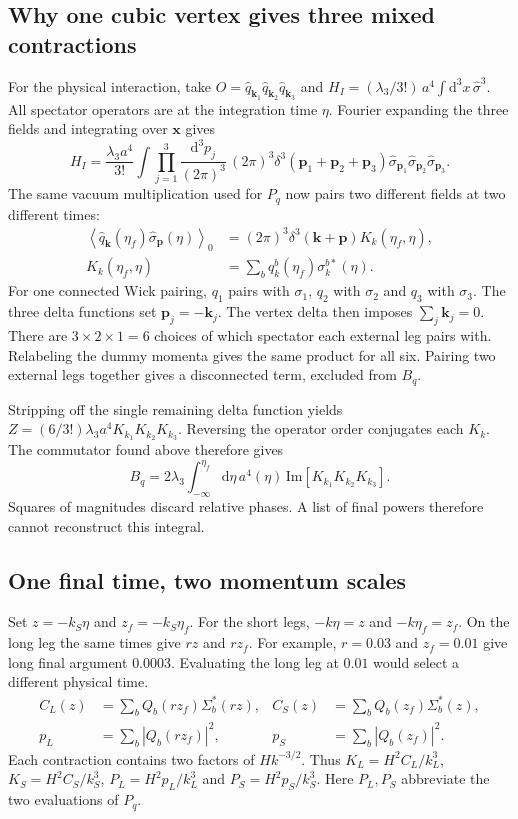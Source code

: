 \documentclass[11pt,a4paper]{article}
\newcommand{\dd}{\mathrm d}
\newcommand{\avg}[1]{\left\langle #1\right\rangle}
\begin{document}
\subsection{Why one cubic vertex gives three mixed contractions}
For the physical interaction, take $O=\hat q_{\mathbf k_1}\hat q_{\mathbf k_2}\hat q_{\mathbf k_3}$ and $H_I=(\lambda_3/3!)\,a^4\int\dd^3x\,\hat\sigma^3$. All spectator operators are at the integration time $\eta$. Fourier expanding the three fields and integrating over $\mathbf x$ gives
\begin{equation}
 H_I=\frac{\lambda_3 a^4}{3!}\int\prod_{j=1}^3\frac{\dd^3p_j}{(2\pi)^3}\,
 (2\pi)^3\delta^3(\mathbf p_1+\mathbf p_2+\mathbf p_3)
 \hat\sigma_{\mathbf p_1}\hat\sigma_{\mathbf p_2}\hat\sigma_{\mathbf p_3}.
\end{equation}
The same vacuum multiplication used for $P_q$ now pairs two different fields at two different times:
\begin{align}
\avg{\hat q_{\mathbf k}(\eta_f)\hat\sigma_{\mathbf p}(\eta)}_0
 &=(2\pi)^3\delta^3(\mathbf k+\mathbf p)K_k(\eta_f,\eta),\nonumber\\
K_k(\eta_f,\eta)&=\sum_b q_k^b(\eta_f)\sigma_k^{b*}(\eta).
\end{align}
For one connected Wick pairing, $q_1$ pairs with $\sigma_1$, $q_2$ with $\sigma_2$ and $q_3$ with $\sigma_3$. The three delta functions set $\mathbf p_j=-\mathbf k_j$. The vertex delta then imposes $\sum_j\mathbf k_j=0$. There are $3\times2\times1=6$ choices of which spectator each external leg pairs with. Relabeling the dummy momenta gives the same product for all six. Pairing two external legs together gives a disconnected term, excluded from $B_q$.

Stripping off the single remaining delta function yields $Z=(6/3!)\lambda_3 a^4 K_{k_1}K_{k_2}K_{k_3}$. Reversing the operator order conjugates each $K_k$. The commutator found above therefore gives
\begin{equation}\boxed{\displaystyle B_q=2\lambda_3\int_{-\infty}^{\eta_f}\dd\eta\,a^4(\eta)\,
 \mathrm{Im}\!\left[K_{k_1}K_{k_2}K_{k_3}\right].}\end{equation}
Squares of magnitudes discard relative phases. A list of final powers therefore cannot reconstruct this integral.
\clearpage
\subsection{One final time, two momentum scales}
Set $z=-k_S\eta$ and $z_f=-k_S\eta_f$. For the short legs, $-k\eta=z$ and $-k\eta_f=z_f$. On the long leg the same times give $rz$ and $rz_f$. For example, $r=0.03$ and $z_f=0.01$ give long final argument $0.0003$. Evaluating the long leg at $0.01$ would select a different physical time.
\begin{align}
C_L(z)&=\sum_b Q_b(rz_f)\Sigma_b^*(rz), &C_S(z)&=\sum_b Q_b(z_f)\Sigma_b^*(z),\nonumber\\
p_L&=\sum_b|Q_b(rz_f)|^2, &p_S&=\sum_b|Q_b(z_f)|^2.
\end{align}
Each contraction contains two factors of $Hk^{-3/2}$. Thus $K_L=H^2 C_L/k_L^3$, $K_S=H^2 C_S/k_S^3$, $P_L=H^2 p_L/k_L^3$ and $P_S=H^2 p_S/k_S^3$. Here $P_L,P_S$ abbreviate the two evaluations of $P_q$.
\end{document}
